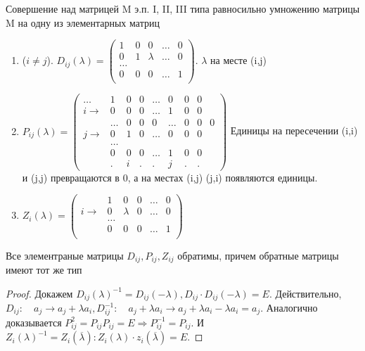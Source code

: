 \begin{proposition}
	Совершение над матрицей M э.п. I, II, III типа равносильно умножению матрицы M на одну из элементарных матриц
	\begin{enumerate}
		\item (\(i\ne j\)). \(D_{ij}(\lambda) = \begin{pmatrix}
			1 & 0 & 0 & \ldots & 0\\
			0 & 1 & \lambda & \ldots & 0 \\
			\ldots \\ 
			0 & 0 & 0 & \ldots & 1 \\
		\end{pmatrix}\). \(\lambda\) на месте (i,j)
		\item \(P_{ij}(\lambda) = \begin{pmatrix}
			\ldots &1 & 0 & 0 & \ldots & 0 & 0 & 0\\
			i \rightarrow & 0 & 0 & 0 & \ldots & 1 & 0 & 0 \\
			&\ldots & 0 & 0 & 0 & \ldots & 0 & 0 & 0\\
			j \rightarrow & 0 & 1 & 0 & \ldots & 0 & 0 & 0\\
			& \ldots \\ 
			& 0 & 0 & 0 & \ldots & 1 & 0 & 0 \\
			& . & i & . & . & j & . & .
		\end{pmatrix}\) Единицы на пересечении (i,i) и (j,j) превращаются в 0, а на местах (i,j) (j,i) появляются единицы.
		\item \(Z_i(\lambda) = \begin{pmatrix}
			&1 & 0 & 0 & \ldots & 0\\
			i \rightarrow &0 & \lambda & 0 & \ldots & 0 \\
			&\ldots \\ 
			&0 & 0 & 0 & \ldots & 1 \\
		\end{pmatrix}\)
	\end{enumerate}
\end{proposition}
\begin{proposition}
	Все элементраные матрицы \(D_{ij}, P_{ij}, Z_{ij}\) обратимы, причем обратные матрицы имеют тот же тип
\end{proposition}
\begin{proof}
	Докажем \(D_{ij}(\lambda)^{-1} = D_{ij}(-\lambda), D_{ij}\cdot D_{ij}(-\lambda) = E\). Действительно, \(D_{ij}:\quad a_{j} \to a_{j} + \lambda a_{i}, D_{ij}^{-1}:\quad a_{j} + \lambda a_{i} \to a_{j} + \lambda a_i - \lambda a_i = a_j\). Аналогично доказывается \(P^2_{ij} = P_{ij}P_{ij} = E \Longrightarrow P^{-1}_{ij} = P_{ij}\). И \(Z_i(\lambda)^{-1} = Z_i(\overline \lambda): Z_i(\lambda)\cdot z_i(\overline \lambda) = E\).
\end{proof}
